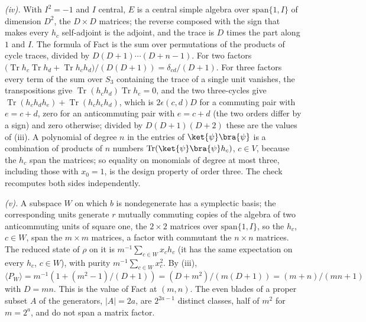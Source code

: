 \emph{(iv).} With $I^{2} = -1$ and $I$ central, $E$ is a central simple algebra over $\mathrm{span}\{1, I\}$ of dimension $D^{2}$, the $D\times D$ matrices; the reverse composed with the sign that makes every $h_{c}$ self-adjoint is the adjoint, and the trace is $D$ times the part along $1$ and $I$. The formula of Fact  is the sum over permutations of the products of cycle traces, divided by $D(D+1)\cdots(D+n-1)$. For two factors $\bigl(\operatorname{Tr}h_{c}\operatorname{Tr}h_{d} + \operatorname{Tr}h_{c}h_{d}\bigr)/(D(D+1)) = \delta_{cd}/(D+1)$. For three factors every term of the sum over $S_{3}$ containing the trace of a single unit vanishes, the transpositions give $\operatorname{Tr}(h_{c}h_{d})\operatorname{Tr}h_{e} = 0$, and the two three-cycles give $\operatorname{Tr}(h_{c}h_{d}h_{e}) + \operatorname{Tr}(h_{c}h_{e}h_{d})$, which is $2\epsilon(c,d)D$ for a commuting pair with $e = c + d$, zero for an anticommuting pair with $e = c + d$ (the two orders differ by a sign) and zero otherwise; divided by $D(D+1)(D+2)$ these are the values of (iii). A polynomial of degree $n$ in the entries of $\ket{\psi}\bra{\psi}$ is a combination of products of $n$ numbers $\operatorname{Tr}(\ket{\psi}\bra{\psi}h_{c})$, $c \in V$, because the $h_{c}$ span the matrices; so equality on monomials of degree at most three, including those with $x_{0} = 1$, is the design property of order three. The check recomputes both sides independently.

\emph{(v).} A subspace $W$ on which $b$ is nondegenerate has a symplectic basis; the corresponding units generate $r$ mutually commuting copies of the algebra of two anticommuting units of square one, the $2\times2$ matrices over $\mathrm{span}\{1, I\}$, so the $h_{c}$, $c \in W$, span the $m\times m$ matrices, a factor with commutant the $n\times n$ matrices. The reduced state of $\rho$ on it is $m^{-1}\sum_{c\in W}x_{c}h_{c}$ (it has the same expectation on every $h_{c}$, $c \in W$), with purity $m^{-1}\sum_{c\in W}x_{c}^{2}$. By (iii), $\langle P_{W}\rangle = m^{-1}(1 + (m^{2} - 1)/(D + 1)) = (D + m^{2})/(m(D + 1)) = (m + n)/(mn + 1)$ with $D = mn$. This is the value of Fact  at $(m, n)$. The even blades of a proper subset $A$ of the generators, $|A| = 2a$, are $2^{2a-1}$ distinct classes, half of $m^{2}$ for $m = 2^{a}$, and do not span a matrix factor.
